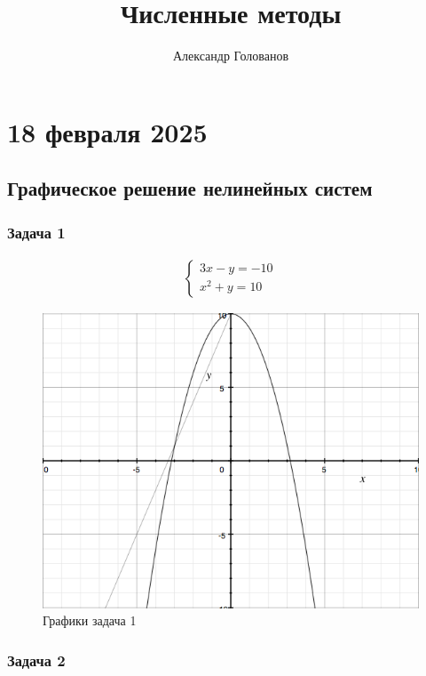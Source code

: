 \documentclass[]{article}
\title{Численные методы}
\author{Александр Голованов}
\begin{document}
\maketitle
\newpage
\tableofcontents
\newpage

\section{18 февраля 2025}
\subsection{Графическое решение нелинейных систем}

\subsubsection{Задача 1}

\begin{gather*}
\begin{cases}
3x-y =-10\\
x^2+y=10
\end{cases}
\end{gather*}

\begin{figure}[h]
\caption{Графики задача 1}
\centering
\includegraphics[width=\textwidth]{graph1}
\end{figure}

\subsubsection{Задача 2}
\end{document}
